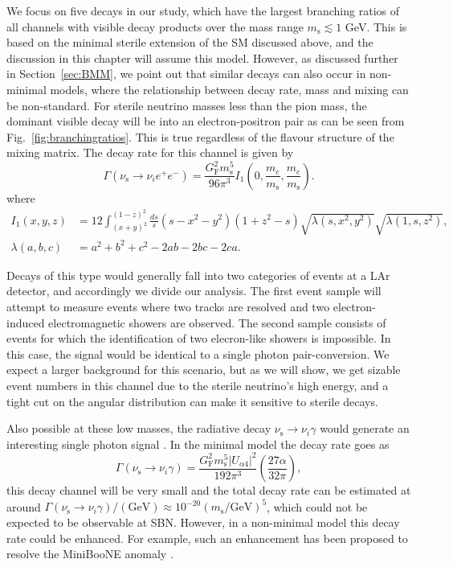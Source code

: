 \documentclass[11pt, a4paper]{article}
\newcommand{\reffig}[1]{Fig.~\ref{#1}}
\newcommand{\refsec}[1]{Section~\ref{#1}}
\begin{document}
We focus on five decays in our study, which have the largest branching ratios
of all channels with visible decay products over the mass range $m_\text{s}
\lesssim 1$ GeV. This is based on the minimal sterile extension of the SM
discussed above, and the discussion in this chapter will assume this model.
However, as discussed further in \refsec{sec:BMM}, we point out that similar
decays can also occur in non-minimal models, where the relationship between
decay rate, mass and mixing can be non-standard. 
%
For sterile neutrino masses less than the pion mass, the dominant visible decay
will be into an electron-positron pair as can be seen from
\reffig{fig:branchingratios}. This is true regardless of the flavour structure
of the mixing matrix. The decay rate for this channel is given by 
%
\[ \Gamma\left(\nu_\text{s}\to \nu_i e^+e^-\right) =
\frac{G_\text{F}^2m_\text{s}^5}{96\pi^3}I_1\left(0,\frac{m_e}{m_\text{s}},\frac{ m_e}{m_\text{s}}\right).  \]
%
where 
\begin{align}
	I_1(x,y,z) & =12 \int_{(x+y)^2}^{(1-z)^2} \frac{ds}{s}(s-x^2-y^2)(1+z^2-s)\sqrt{\lambda(s,x^2,y^2)}\sqrt{\lambda(1,s,z^2)},\\
\lambda(a,b,c) &= a^2+b^2+c^2 - 2ab-2bc-2ca.
\end{align}

%
Decays of this type would generally fall into two categories of events at a LAr
detector, and accordingly we divide our analysis. The first event sample will
attempt to measure events where two tracks are resolved and two
electron-induced electromagnetic showers are observed.
%
The second sample consists of events for which the identification of two
elecron-like showers is impossible. In this case, the signal would be identical
to a single photon pair-conversion. We expect a larger background for this
scenario, but as we will show, we get sizable event numbers in this channel due
to the sterile neutrino's high energy, and a tight cut on the angular
distribution can make it sensitive to sterile decays.

Also possible at these low masses, the radiative decay
$\nu_\text{s}\to\nu_i\gamma$ would generate an interesting single photon
signal \cite{PhysRevD.25.766}. In the minimal model the decay rate goes as
%
\[ \Gamma(\nu_\text{s}\to\nu_i\gamma) = \frac{G_\text{F}^2m_\text{s}^5 |U_{\alpha 4}|^2}{192 \pi^3} \left( \frac{27 \alpha}{32 \pi} \right), \]
%
this decay channel will be very small and the total decay rate can be estimated
at around $\Gamma(\nu_\text{s}\to\nu_i\gamma)/(\text{GeV}) \approx 10^{-20}
(m_\text{s}/\text{GeV})^5$, which could not be expected to be observable at
SBN.  However, in a non-minimal model this decay rate could be enhanced. For
example, such an enhancement has been proposed to resolve the MiniBooNE anomaly
\cite{Gninenko:2009ks,Gninenko:2010pr}.  
\end{document}
